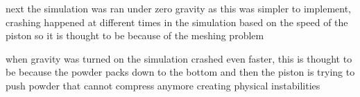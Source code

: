 next the simulation was ran under zero gravity as this was simpler to implement, crashing happened at different times in the simulation based on the speed of the piston so it is thought to be because of the meshing problem

when gravity was turned on the simulation crashed even faster, this is thought to be because the powder packs down to the bottom and then the piston is trying to push powder that cannot compress anymore creating physical instabilities


















